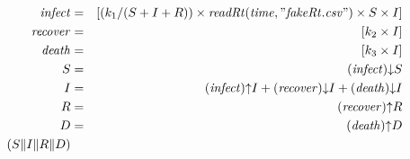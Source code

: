 \begin{eqnarray*}
\mathit{infect} & = & [(k_1/(S+I+R))\times \mathit{readRt}(\mathit{time},"\mathit{fakeRt}.\mathit{csv}")\times S\times I]\\%
\mathit{recover} & = & [k_2\times I]\\%
\mathit{death} & = & [k_3\times I]\\%
%
S & = & (\mathit{infect}){\downarrow}S\\%
I & = & (\mathit{infect}){\uparrow}I + (\mathit{recover}){\downarrow}I + (\mathit{death}){\downarrow}I\\%
R & = & (\mathit{recover}){\uparrow}R\\%
D & = & (\mathit{death}){\uparrow}D\\%
%
(S {\parallel} I {\parallel} R {\parallel} D)\end{eqnarray*}
